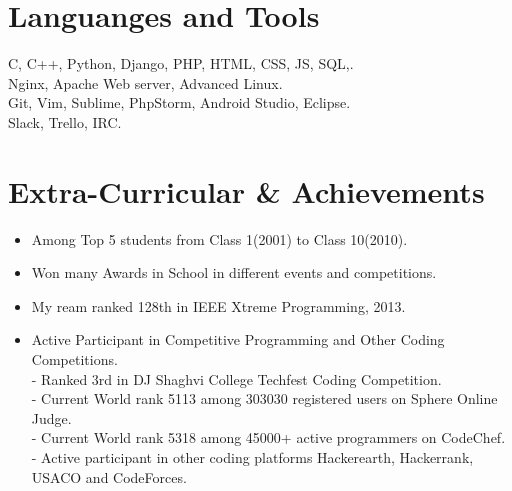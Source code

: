\documentclass[margin,line]{res}
\begin{document}
\begin{resume}
\section{Languanges and Tools}
C, C++, Python, Django, PHP, HTML, CSS, JS, SQL,.\\
Nginx, Apache Web server, Advanced Linux.\\ 
Git, Vim, Sublime, PhpStorm, Android Studio, Eclipse.\\
Slack, Trello, IRC.\\


\section{Extra-Curricular \& Achievements}

\begin{itemize} \itemsep -4pt
 \item Among Top 5 students from Class 1(2001) to Class 10(2010).\\
 \item Won many Awards in School in different events and competitions.\\
 \item My ream ranked 128th in IEEE Xtreme Programming, 2013.\\
 \item Active Participant in Competitive Programming and Other Coding Competitions. \\
 - Ranked 3rd in DJ Shaghvi College Techfest Coding Competition.\\
 - Current World rank 5113 among 303030 registered users on Sphere Online Judge. \\
 - Current World rank 5318 among 45000+ active programmers on CodeChef.\\
 - Active participant in other coding platforms Hackerearth, Hackerrank, USACO and CodeForces.
\end{itemize}





\end{resume}
\end{document}
